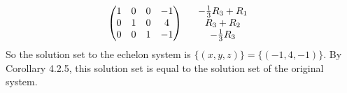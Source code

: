\documentclass[12pt]{article}
\newenvironment{problem}[2][Problem]
{
	\begin{trivlist} 
		\item[\hskip \labelsep {\bfseries #1 #2:}]
	}
{
	\end{trivlist}
	}
\newenvironment{solution}[1][Solution]
{
	\begin{trivlist} 
		\item[\hskip \labelsep {\itshape #1:}]
	}
	{
	\end{trivlist}
}
\begin{document}
\begin{problem}{1}
\begin{solution}
\begin{align*}
& \begin{pmatrix} 1&0&0&-1\\0&1&0&4\\0&0&1&-1 \end{pmatrix} \hphantom{500} \begin{matrix} -\frac{1}{3} R_3 + R_1 \\  R_3 + R_2 \\ -\frac{1}{3} R_3 \end{matrix}
\end{align*}
So the solution set to the echelon system is $\{(x,y,z)\}=\{(-1,4,-1)\}$. By Corollary 4.2.5, this solution set is equal to the solution set of the original system.
\end{solution}
\end{problem}
\end{document}
